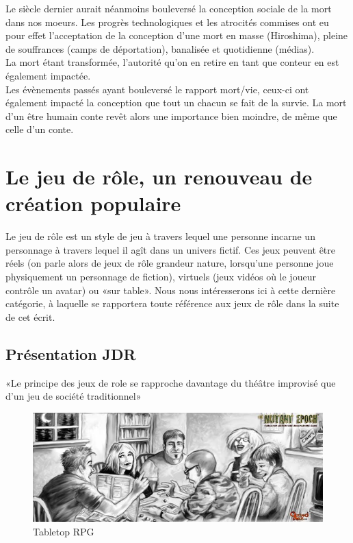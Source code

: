 \documentclass[a4paper,12pt,final,oneside]{article}
\begin{document}
Le siècle dernier aurait néanmoins bouleversé la conception sociale de la mort dans nos moeurs. Les progrès technologiques et les atrocités commises ont eu pour effet l'acceptation de la conception d'une mort en masse (Hiroshima), pleine de souffrances (camps de déportation), banalisée et quotidienne (médias).\\
La mort étant transformée, l'autorité qu'on en retire en tant que conteur en est également impactée.\\
Les évènements passés ayant bouleversé le rapport mort/vie, ceux-ci ont également impacté la conception que tout un chacun se fait de la survie. La mort d'un être humain conte revêt alors une importance bien moindre, de même que celle d'un conte.


\clearpage


\section{Le jeu de rôle, un renouveau de création populaire}

Le jeu de rôle est un style de jeu à travers lequel une personne incarne un personnage à travers lequel il agît dans un univers fictif. Ces jeux peuvent être réels (on parle alors de jeux de rôle grandeur nature, lorsqu'une personne joue physiquement un personnage de fiction), virtuels (jeux vidéos où le joueur contrôle un avatar) ou «sur table». Nous nous intéresserons ici à cette dernière catégorie, à laquelle se rapportera toute référence aux jeux de rôle dans la suite de cet écrit.

\subsection{Présentation JDR}

«Le principe des jeux de role se rapproche davantage du théâtre improvisé que d'un jeu de société traditionnel» \cite{cristofari2010lecteur}\\
\begin{figure}[h!]
    \centering
    \includegraphics[width=0.80\linewidth]{img/rpg_tabletop1.jpg}
    \caption{Tabletop RPG}
\end{figure}
\end{document}
